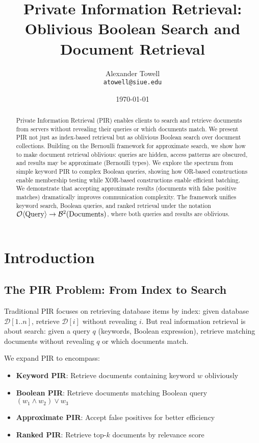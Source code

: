 \documentclass[11pt,final]{article}
\title{Private Information Retrieval: Oblivious Boolean Search and Document Retrieval}
\author{
    Alexander Towell\\
    \texttt{atowell@siue.edu}
}
\date{\today}
\newcommand{\DB}{\mathcal{D}}
\begin{document}
\maketitle

\begin{abstract}
Private Information Retrieval (PIR) enables clients to search and retrieve documents from servers without revealing their queries or which documents match. We present PIR not just as index-based retrieval but as oblivious Boolean search over document collections. Building on the Bernoulli framework for approximate search, we show how to make document retrieval oblivious: queries are hidden, access patterns are obscured, and results may be approximate (Bernoulli types). We explore the spectrum from simple keyword PIR to complex Boolean queries, showing how OR-based constructions enable membership testing while XOR-based constructions enable efficient batching. We demonstrate that accepting approximate results (documents with false positive matches) dramatically improves communication complexity. The framework unifies keyword search, Boolean queries, and ranked retrieval under the notation $\Obv{\text{Query}} \to \Bernoulli{\text{Documents}}{2}$, where both queries and results are oblivious.
\end{abstract}


\ObliviousNotationGuide

\section{Introduction}

\subsection{The PIR Problem: From Index to Search}

Traditional PIR focuses on retrieving database items by index: given database $\DB[1..n]$, retrieve $\DB[i]$ without revealing $i$. But real information retrieval is about search: given a query $q$ (keywords, Boolean expression), retrieve matching documents without revealing $q$ or which documents match.

We expand PIR to encompass:
\begin{itemize}
    \item \textbf{Keyword PIR}: Retrieve documents containing keyword $w$ obliviously
    \item \textbf{Boolean PIR}: Retrieve documents matching Boolean query $(w_1 \land w_2) \lor w_3$
    \item \textbf{Approximate PIR}: Accept false positives for better efficiency
    \item \textbf{Ranked PIR}: Retrieve top-$k$ documents by relevance score
\end{itemize}
\end{document}
